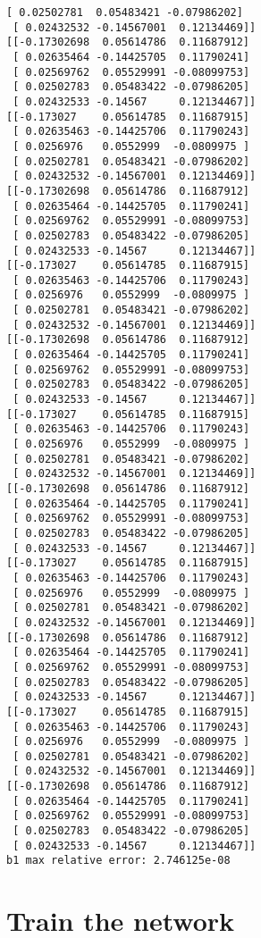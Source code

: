 \documentclass[11pt]{article}
\begin{document}
\begin{Verbatim}[commandchars=\\\{\}]
 [ 0.02502781  0.05483421 -0.07986202]
 [ 0.02432532 -0.14567001  0.12134469]]
[[-0.17302698  0.05614786  0.11687912]
 [ 0.02635464 -0.14425705  0.11790241]
 [ 0.02569762  0.05529991 -0.08099753]
 [ 0.02502783  0.05483422 -0.07986205]
 [ 0.02432533 -0.14567     0.12134467]]
[[-0.173027    0.05614785  0.11687915]
 [ 0.02635463 -0.14425706  0.11790243]
 [ 0.0256976   0.0552999  -0.0809975 ]
 [ 0.02502781  0.05483421 -0.07986202]
 [ 0.02432532 -0.14567001  0.12134469]]
[[-0.17302698  0.05614786  0.11687912]
 [ 0.02635464 -0.14425705  0.11790241]
 [ 0.02569762  0.05529991 -0.08099753]
 [ 0.02502783  0.05483422 -0.07986205]
 [ 0.02432533 -0.14567     0.12134467]]
[[-0.173027    0.05614785  0.11687915]
 [ 0.02635463 -0.14425706  0.11790243]
 [ 0.0256976   0.0552999  -0.0809975 ]
 [ 0.02502781  0.05483421 -0.07986202]
 [ 0.02432532 -0.14567001  0.12134469]]
[[-0.17302698  0.05614786  0.11687912]
 [ 0.02635464 -0.14425705  0.11790241]
 [ 0.02569762  0.05529991 -0.08099753]
 [ 0.02502783  0.05483422 -0.07986205]
 [ 0.02432533 -0.14567     0.12134467]]
[[-0.173027    0.05614785  0.11687915]
 [ 0.02635463 -0.14425706  0.11790243]
 [ 0.0256976   0.0552999  -0.0809975 ]
 [ 0.02502781  0.05483421 -0.07986202]
 [ 0.02432532 -0.14567001  0.12134469]]
[[-0.17302698  0.05614786  0.11687912]
 [ 0.02635464 -0.14425705  0.11790241]
 [ 0.02569762  0.05529991 -0.08099753]
 [ 0.02502783  0.05483422 -0.07986205]
 [ 0.02432533 -0.14567     0.12134467]]
[[-0.173027    0.05614785  0.11687915]
 [ 0.02635463 -0.14425706  0.11790243]
 [ 0.0256976   0.0552999  -0.0809975 ]
 [ 0.02502781  0.05483421 -0.07986202]
 [ 0.02432532 -0.14567001  0.12134469]]
[[-0.17302698  0.05614786  0.11687912]
 [ 0.02635464 -0.14425705  0.11790241]
 [ 0.02569762  0.05529991 -0.08099753]
 [ 0.02502783  0.05483422 -0.07986205]
 [ 0.02432533 -0.14567     0.12134467]]
[[-0.173027    0.05614785  0.11687915]
 [ 0.02635463 -0.14425706  0.11790243]
 [ 0.0256976   0.0552999  -0.0809975 ]
 [ 0.02502781  0.05483421 -0.07986202]
 [ 0.02432532 -0.14567001  0.12134469]]
[[-0.17302698  0.05614786  0.11687912]
 [ 0.02635464 -0.14425705  0.11790241]
 [ 0.02569762  0.05529991 -0.08099753]
 [ 0.02502783  0.05483422 -0.07986205]
 [ 0.02432533 -0.14567     0.12134467]]
b1 max relative error: 2.746125e-08

    \end{Verbatim}

    \section{Train the network}\label{train-the-network}
\end{document}
